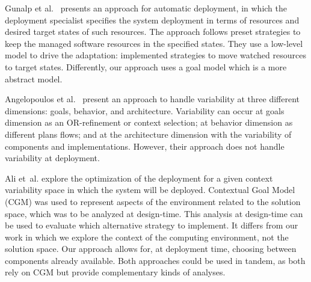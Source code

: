Gunalp et al.~\citep{gunalp_rondo_2015} presents an approach for automatic deployment, in which the deployment specialist specifies the system deployment in terms of resources and desired target states of such resources. The approach follows preset strategies to keep the managed software resources in the specified states. They use a low-level model to drive the adaptation: implemented strategies to move watched resources to target states. Differently, our approach uses a goal model which is a more abstract model.

Angelopoulos et al.~\cite{angelopoulos_capturing_2015} present an approach to handle  variability at three different dimensions: goals, behavior, and architecture. Variability can occur at goals dimension as an OR-refinement or context selection; at behavior dimension as different plans flows; and at the architecture dimension with the variability of components and implementations. However, their approach does not handle variability at deployment.


Ali et~al.\cite{ali_requirements-driven_2014} explore the optimization of the deployment for a given context variability space in which the system will be deployed. Contextual Goal Model (CGM) was used to represent aspects of the environment related to the solution space, which was to be analyzed at design-time. This analysis at design-time can be used to evaluate which alternative strategy to implement.
It differs from our work in which we explore the context of the computing environment, not the solution space. Our approach allows for, at deployment time, choosing  between components already available. Both approaches could be used in tandem, as both rely on CGM but provide complementary kinds of analyses.



